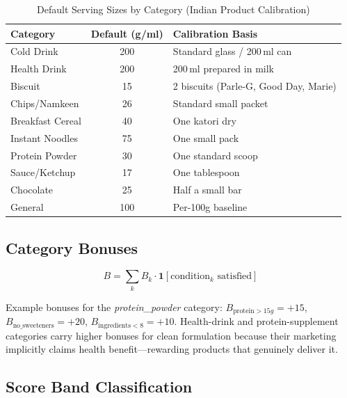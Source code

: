 \documentclass[conference]{IEEEtran}
\begin{document}
\begin{table}[ht]
\caption{Default Serving Sizes by Category (Indian Product Calibration)}
\label{tab:serving}
\begin{center}
\footnotesize
\begin{tabular}{|l|c|l|}
\hline
\textbf{Category} & \textbf{Default (g/ml)} & \textbf{Calibration Basis} \\
\hline
Cold Drink      & 200 & Standard glass / 200\,ml can \\
Health Drink    & 200 & 200\,ml prepared in milk \\
Biscuit         & 15  & 2 biscuits (Parle-G, Good Day, Marie) \\
Chips/Namkeen   & 26  & Standard small packet \\
Breakfast Cereal& 40  & One katori dry \\
Instant Noodles & 75  & One small pack \\
Protein Powder  & 30  & One standard scoop \\
Sauce/Ketchup   & 17  & One tablespoon \\
Chocolate       & 25  & Half a small bar \\
General         & 100 & Per-100g baseline \\
\hline
\end{tabular}
\end{center}
\end{table}

\subsection{Category Bonuses}

\begin{equation}
B = \sum_{k} B_k \cdot \mathbf{1}[\text{condition}_k \text{ satisfied}]
\label{eq:bonus}
\end{equation}

Example bonuses for the \textit{protein\_powder} category:
$B_{\text{protein}>15g} = +15$,
$B_{\text{no\_sweeteners}} = +20$,
$B_{\text{ingredients}<8} = +10$.
Health-drink and protein-supplement categories carry higher bonuses for clean
formulation because their marketing implicitly claims health benefit---rewarding
products that genuinely deliver it.

\subsection{Score Band Classification}
\end{document}
